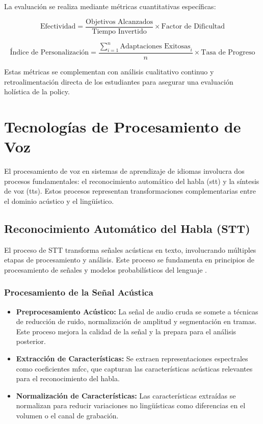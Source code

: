 La evaluación se realiza mediante métricas cuantitativas específicas:

\begin{equation}
  \text{Efectividad} = \frac{\text{Objetivos Alcanzados}}{\text{Tiempo Invertido}} \times \text{Factor de Dificultad}
\end{equation}

\begin{equation}
  \text{Índice de Personalización} = \frac{\sum_{i=1}^{n} \text{Adaptaciones Exitosas}_i}{n} \times \text{Tasa de Progreso}
\end{equation}

Estas métricas se complementan con análisis cualitativo continuo y retroalimentación directa de los estudiantes para asegurar una evaluación holística de la \gls{policy}.


\section{Tecnologías de Procesamiento de Voz}

El procesamiento de voz en sistemas de aprendizaje de idiomas involucra dos procesos fundamentales: el reconocimiento automático del habla (\gls{stt}) y la síntesis de voz (\gls{tts}). Estos procesos representan transformaciones complementarias entre el dominio acústico y el lingüístico.

\subsection{Reconocimiento Automático del Habla (STT)}

El proceso de STT transforma señales acústicas en texto, involucrando múltiples etapas de procesamiento y análisis. Este proceso se fundamenta en principios de procesamiento de señales y modelos probabilísticos del lenguaje \cite{graves2013speech}.

\subsubsection{Procesamiento de la Señal Acústica}

\begin{itemize}
  \item \textbf{Preprocesamiento Acústico:} La señal de audio cruda se somete a técnicas de reducción de ruido, normalización de amplitud y segmentación en tramas. Este proceso mejora la calidad de la señal y la prepara para el análisis posterior.

  \item \textbf{Extracción de Características:} Se extraen representaciones espectrales como coeficientes \gls{mfcc}, que capturan las características acústicas relevantes para el reconocimiento del habla.

  \item \textbf{Normalización de Características:} Las características extraídas se normalizan para reducir variaciones no lingüísticas como diferencias en el volumen o el canal de grabación.
\end{itemize}

